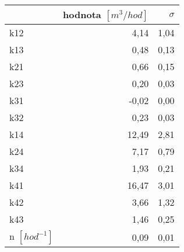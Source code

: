 \begin{tabular}{lrr}
\toprule
{} &  hodnota $\left[\si{m^3/hod}\right]$ &  $\sigma$ \\
\midrule
k12                 &                                 4,14 &      1,04 \\
k13                 &                                 0,48 &      0,13 \\
k21                 &                                 0,66 &      0,15 \\
k23                 &                                 0,20 &      0,03 \\
k31                 &                                -0,02 &      0,00 \\
k32                 &                                 0,23 &      0,03 \\
k14                 &                                12,49 &      2,81 \\
k24                 &                                 7,17 &      0,79 \\
k34                 &                                 1,93 &      0,21 \\
k41                 &                                16,47 &      3,01 \\
k42                 &                                 3,66 &      1,32 \\
k43                 &                                 1,46 &      0,25 \\
n $[\si{hod^{-1}}]$ &                                 0,09 &      0,01 \\
\bottomrule
\end{tabular}
